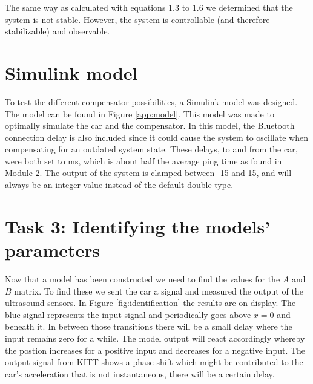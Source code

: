 \documentclass[final]{scrreprt} %
\begin{document}
The same way as calculated with equations 1.3 to 1.6 we determined that the system is not stable.
However, the system is controllable (and therefore stabilizable) and observable.

\section*{Simulink model}
To test the different compensator possibilities, a Simulink model was designed.
The model can be found in Figure \ref{app:model}.
This model was made to optimally simulate the car and the compensator.
In this model, the Bluetooth connection delay is also included since it could cause the system to oscillate when compensating for an outdated system state.
These delays, to and from the car, were both set to \unit[50]{ms}, which is about half the average ping time as found in Module 2.
The output of the system is clamped between -15 and 15, and will always be an integer value instead of the default double type.

\section*{Task 3: Identifying the models' parameters}
Now that a model has been constructed we need to find the values for the $A$ and $B$ matrix.
To find these we sent the car a signal and measured the output of the ultrasound sensors.
In Figure \ref{fig:identification} the results are on display.
The blue signal represents the input signal and periodically goes above $x=0$ and beneath it.
In between those transitions there will be a small delay where the input remains zero for a while.
The model output will react accordingly whereby the postion increases for a positive input and decreases for a negative input.
The output signal from KITT shows a phase shift which might be contributed to the car's acceleration that is not instantaneous, there will be a certain delay.
\end{document}
